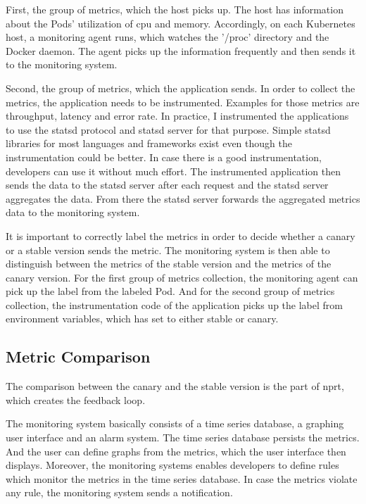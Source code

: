 First, the group of metrics, which the host picks up. The host has information about the
Pods' utilization of \gls{cpu} and memory. Accordingly, on each Kubernetes host, a monitoring
agent runs, which watches the '/proc' directory and the Docker daemon. The agent picks up
the information frequently and then sends it to the monitoring system.

Second, the group of metrics, which the application sends. In order to collect the
metrics, the application needs to be instrumented. Examples for those metrics are
throughput, latency and error rate. In practice, I instrumented the applications to use the
statsd protocol and statsd server for that purpose. Simple statsd libraries for most
languages and frameworks exist even though the instrumentation could be better. In case
there is a good instrumentation, developers can use it without much effort. The
instrumented application then sends the data to the statsd server after each request and
the statsd server aggregates the data. From there the statsd server forwards the
aggregated metrics data to the monitoring system.

It is important to correctly label the metrics in order to decide whether a canary or a
stable version sends the metric. The monitoring system is then able to distinguish between
the metrics of the stable version and the metrics of the canary version. For the first
group of metrics collection, the monitoring agent can pick up the label from the labeled
Pod. And for the second group of metrics collection, the instrumentation code of the
application picks up the label from environment variables, which \deployer{} has set to
either stable or canary.

\subsection{Metric Comparison}
\label{sec:metric_comparison}

The comparison between the canary and the stable version is the part of \gls{nprt}, which
creates the feedback loop.

The monitoring system basically consists of a time series database, a graphing user
interface and an alarm system. The time series database persists the metrics. And the user
can define graphs from the metrics, which the user interface then displays. Moreover, the
monitoring systems enables developers to define rules which monitor the metrics in the
time series database. In case the metrics violate any rule, the monitoring system sends a
notification.

